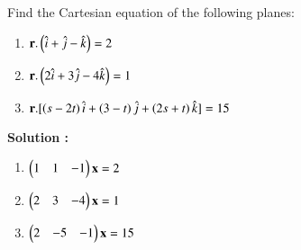Find the Cartesian equation of the following planes:


\begin{enumerate}
    \item $\mathbf{r}.\left(\hat{i}+\hat{j}-\hat{k}\right)=2$
    \item $\mathbf{r}.\left(2\hat{i}+3\hat{j}-4\hat{k}\right)=1$
    \item $\mathbf{r}.[\left(s-2t\right)\hat{i}+\left(3-t\right)\hat{j}+\left(2s+t\right)\hat{k}]=15$
\end{enumerate}


\textbf{Solution :}
\begin{enumerate}
    \item $\begin{pmatrix}1&1&-1\end{pmatrix} \mathbf{x} = 2$
    \item $\begin{pmatrix}2&3&-4\end{pmatrix} \mathbf{x} = 1$
    \item $\begin{pmatrix}2&-5&-1\end{pmatrix} \mathbf{x} = 15$

\end{enumerate}

